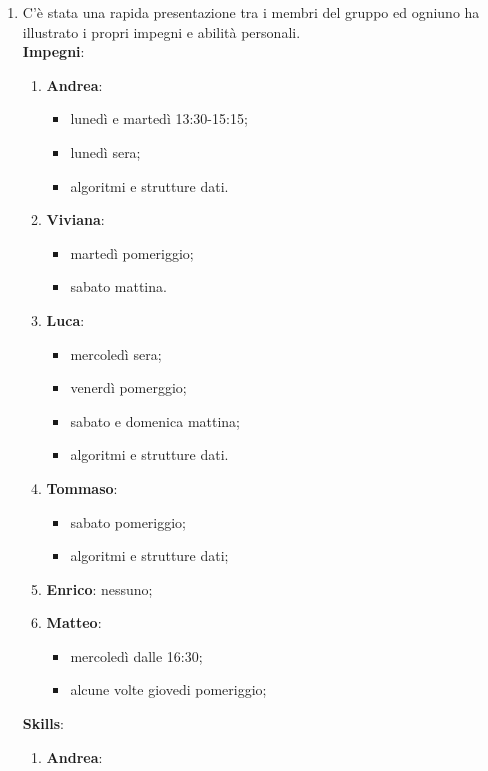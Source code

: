 \documentclass[a4paper,titlepage]{article}
\begin{document}
\begin{enumerate}
  \item C'è stata una rapida presentazione tra i membri del gruppo ed ogniuno ha illustrato i propri impegni e abilità personali.\\
  \textbf{Impegni}:
    	\begin{enumerate}
    		\item \textbf{Andrea}:
    		\begin{itemize}
    			\item lunedì e martedì 13:30-15:15;
    			\item lunedì sera;
    			\item algoritmi e strutture dati.
    		\end{itemize}
    		\item \textbf{Viviana}:
    		\begin{itemize}
    			\item martedì pomeriggio;
    			\item sabato mattina.
    		\end{itemize}
    		\item \textbf{Luca}: 
    		\begin{itemize}
    			\item mercoledì sera;
    			\item venerdì pomerggio;
    			\item sabato e domenica mattina;
    			\item algoritmi e strutture dati.
    		\end{itemize}
    		\item \textbf{Tommaso}: 
    		\begin{itemize}
    			\item sabato pomeriggio;
    			\item algoritmi e strutture dati;
    		\end{itemize}
    		\item \textbf{Enrico}: nessuno;
    		\item \textbf{Matteo}: 
    		\begin{itemize}
    			\item mercoledì dalle 16:30;
    			\item alcune volte giovedi pomeriggio;
    		\end{itemize}
    	\end{enumerate}
    	\textbf{Skills}:
    	\begin{enumerate}
    		\item \textbf{Andrea}:
    		\begin{itemize}

\end{itemize}
\end{enumerate}
\end{enumerate}
\end{document}
